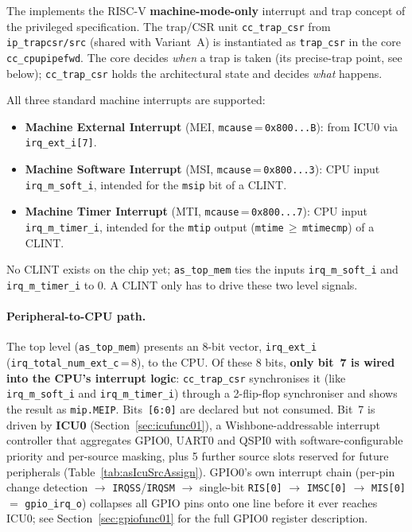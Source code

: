 The \aschip{} implements the RISC-V \textbf{machine-mode-only} interrupt and
trap concept of the privileged specification. The trap/CSR unit
\texttt{cc\_trap\_csr} from \texttt{ip\_trapcsr/src} (shared with Variant~A)
is instantiated as \texttt{trap\_csr} in the core \texttt{cc\_cpupipefwd}. The core decides \emph{when} a trap is
taken (its precise-trap point, see below); \texttt{cc\_trap\_csr} holds the
architectural state and decides \emph{what} happens.

All three standard machine interrupts are supported:
\begin{itemize}
  \item \textbf{Machine External Interrupt} (MEI, \texttt{mcause}\,=\,\texttt{0x800...B}):
    from ICU0 via \texttt{irq\_ext\_i[7]}.
  \item \textbf{Machine Software Interrupt} (MSI, \texttt{mcause}\,=\,\texttt{0x800...3}):
    CPU input \texttt{irq\_m\_soft\_i}, intended for the \texttt{msip} bit of
    a CLINT.
  \item \textbf{Machine Timer Interrupt} (MTI, \texttt{mcause}\,=\,\texttt{0x800...7}):
    CPU input \texttt{irq\_m\_timer\_i}, intended for the \texttt{mtip}
    output (\texttt{mtime}\,$\geq$\,\texttt{mtimecmp}) of a CLINT.
\end{itemize}
No CLINT exists on the chip yet; \texttt{as\_top\_mem}
ties the inputs \texttt{irq\_m\_soft\_i} and \texttt{irq\_m\_timer\_i} to 0.
A CLINT only has to drive these two level signals.

\paragraph{Peripheral-to-CPU path.}
The top level (\texttt{as\_top\_mem}) presents an 8-bit vector,
\texttt{irq\_ext\_i} (\texttt{irq\_total\_num\_ext\_c}\,=\,8), to the CPU.
Of these 8 bits, \textbf{only bit~7 is wired into the CPU's interrupt
logic}: \texttt{cc\_trap\_csr} synchronises it (like
\texttt{irq\_m\_soft\_i} and \texttt{irq\_m\_timer\_i}) through a
2-flip-flop synchroniser and shows the result as \texttt{mip.MEIP}.
Bits~\texttt{[6:0]} are declared but not consumed.
Bit~7 is driven by \textbf{ICU0} (Section~\ref{sec:icufunc01}), a
Wishbone-addressable interrupt controller that aggregates GPIO0, UART0
and QSPI0 with software-configurable
priority and per-source masking, plus 5 further source slots reserved for
future peripherals (Table~\ref{tab:asIcuSrcAssign}). GPIO0's own interrupt
chain (per-pin change detection $\rightarrow$ \texttt{IRQSS}/\texttt{IRQSM}
$\rightarrow$ single-bit \texttt{RIS[0]} $\rightarrow$ \texttt{IMSC[0]}
$\rightarrow$ \texttt{MIS[0]} $=$ \texttt{gpio\_irq\_o}) collapses all GPIO
pins onto one line before it ever reaches ICU0; see
Section~\ref{sec:gpiofunc01} for the full GPIO0 register description.

